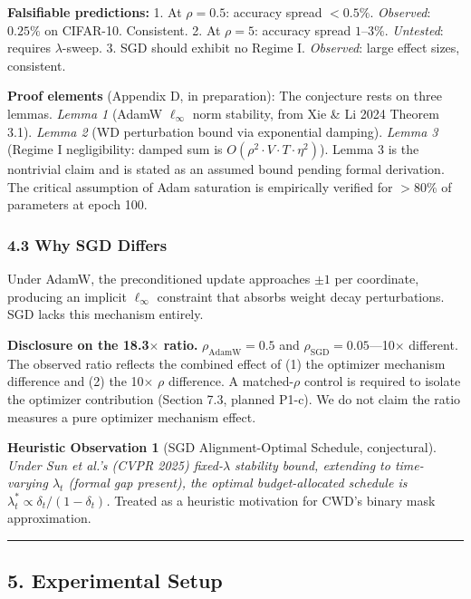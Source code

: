 \documentclass[
]{article}
\begin{document}
\textbf{Falsifiable predictions:} 1. At \(\rho = 0.5\): accuracy spread
\(< 0.5\%\). \emph{Observed}: \(0.25\%\) on CIFAR-10. Consistent. 2. At
\(\rho = 5\): accuracy spread \(1\)--\(3\%\). \emph{Untested}: requires
\(\lambda\)-sweep. 3. SGD should exhibit no Regime I. \emph{Observed}:
large effect sizes, consistent.

\textbf{Proof elements} (Appendix D, in preparation): The conjecture
rests on three lemmas. \emph{Lemma 1} (AdamW \(\ell_\infty\) norm
stability, from Xie \& Li 2024 Theorem 3.1). \emph{Lemma 2} (WD
perturbation bound via exponential damping). \emph{Lemma 3} (Regime I
negligibility: damped sum is
\(O(\rho^2 \cdot V \cdot T \cdot \eta^2)\)). Lemma 3 is the nontrivial
claim and is stated as an assumed bound pending formal derivation. The
critical assumption of Adam saturation is empirically verified for
\(> 80\%\) of parameters at epoch 100.

\hypertarget{why-sgd-differs}{%
\subsubsection{4.3 Why SGD Differs}\label{why-sgd-differs}}

Under AdamW, the preconditioned update approaches \(\pm 1\) per
coordinate, producing an implicit \(\ell_\infty\) constraint that
absorbs weight decay perturbations. SGD lacks this mechanism entirely.

\textbf{Disclosure on the 18.3\(\times\) ratio.}
\(\rho_{\text{AdamW}} = 0.5\) and
\(\rho_{\text{SGD}} = 0.05\)---10\(\times\) different. The observed
ratio reflects the combined effect of (1) the optimizer mechanism
difference and (2) the 10\(\times\) \(\rho\) difference. A
matched-\(\rho\) control is required to isolate the optimizer
contribution (Section 7.3, planned P1-c). We do not claim the ratio
measures a pure optimizer mechanism effect.

\textbf{Heuristic Observation 1} (SGD Alignment-Optimal Schedule,
conjectural). \emph{Under Sun et al.'s (CVPR 2025) fixed-\(\lambda\)
stability bound, extending to time-varying \(\lambda_t\) (formal gap
present), the optimal budget-allocated schedule is
\(\lambda_t^* \propto \delta_t / (1 - \delta_t)\).} Treated as a
heuristic motivation for CWD's binary mask approximation.

\begin{center}\rule{0.5\linewidth}{0.5pt}\end{center}

\hypertarget{experimental-setup}{%
\subsection{5. Experimental Setup}\label{experimental-setup}}
\end{document}
